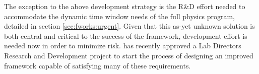 \documentclass[../main-v1.tex]{subfiles}
\begin{document}
The exception to the above development strategy is the R\&D effort needed to accommodate the dynamic time window needs of the full  physics program, detailed in section \ref{sec:fworks:urgent}.  Given that this as-yet unknown solution is both central and critical to the success of the framework, development effort is needed now in order to minimize risk.
 has recently approved a Lab Directors Research and Development project to start the process of designing an improved framework capable of satisfying many of these requirements. 







%
\end{document}
